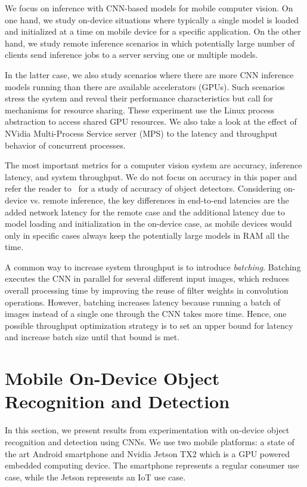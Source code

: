 \documentclass[sigconf]{acmart}
\begin{document}
We focus on inference with CNN-based models for mobile computer vision. On one hand, we study on-device situations where typically a single model is loaded and initialized at a time on mobile device for a specific application. On the other hand, we study remote inference scenarios in which potentially large number of clients send inference jobs to a server serving one or multiple models.

In the latter case, we also study scenarios where there are more CNN inference models running than there are available accelerators (GPUs). Such scenarios stress the system and reveal their performance characteristics but call for mechanisms for resource sharing.
These experiment use the Linux process abstraction to access shared GPU resources.
We also take a look at the effect of NVidia Multi-Process Service server (MPS)\cite{mps} to the latency and throughput behavior of concurrent processes.


The most important metrics for a computer vision system are accuracy, inference latency, and system throughput.
We do not focus on accuracy in this paper and refer the reader to~\cite{Huang2017CVPR} for a study of accuracy of object detectors. Considering on-device vs. remote inference, the key differences in end-to-end latencies are the added network latency for the remote case and the additional latency due to model loading and initialization in the on-device case, as mobile devices would only in specific cases always keep the potentially large models in RAM all the time.

A common way to increase system throughput is to introduce \textit{batching}. Batching executes the CNN in parallel for several different input images, which reduces overall processing time by improving the reuse of filter weights in convolution operations. However, batching increases latency because running a batch of images instead of a single one through the CNN takes more time. Hence, one possible throughput optimization strategy is to set an upper bound for latency and increase batch size until that bound is met.



\section{Mobile On-Device Object Recognition and Detection}\label{sec:mobile}

In this section, we present results from experimentation with on-device object recognition and detection using CNNs. We use two mobile platforms: a state of the art Android smartphone and Nvidia Jetson TX2 which is a GPU powered embedded computing device. The smartphone represents a regular consumer use case, while the Jetson represents an IoT use case.
\end{document}
